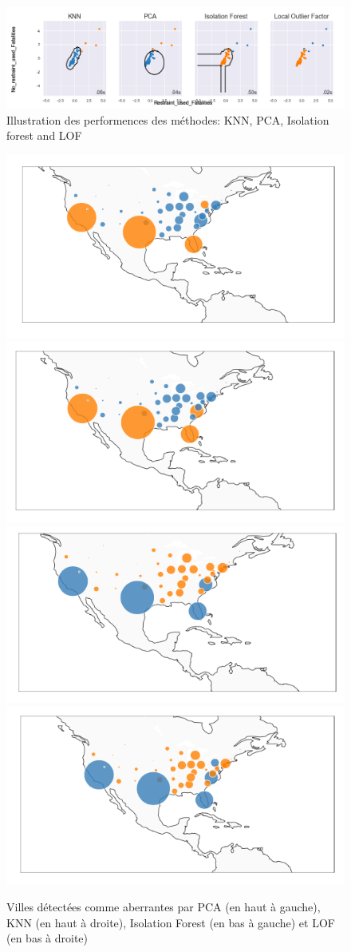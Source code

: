  \begin{figure}[H]
    \centering
    \includegraphics[width=1\textwidth]{ADOA/Images/Fatal11.png}
    \caption{Illustration des performences des méthodes: KNN, PCA, Isolation forest and LOF}%
    \label{fig3}
\end{figure}
\vspace{2cm}

\begin{figure}[t]
    \centering
    \includegraphics[width=.45\textwidth]{ADOA/Images/FatPCA.png}
    \includegraphics[width=.450\textwidth]{ADOA/Images/FatKNN.png}\\
    \includegraphics[width=.45\textwidth]{ADOA/Images/FatIsofore.png}
    \includegraphics[width=.450\textwidth]{ADOA/Images/FatLOF.png}
    \caption{Villes détectées comme aberrantes par PCA (en haut à gauche), KNN (en haut à droite), Isolation Forest (en bas à gauche) et LOF (en bas à droite)}%
    \label{fig2b}
\end{figure}

